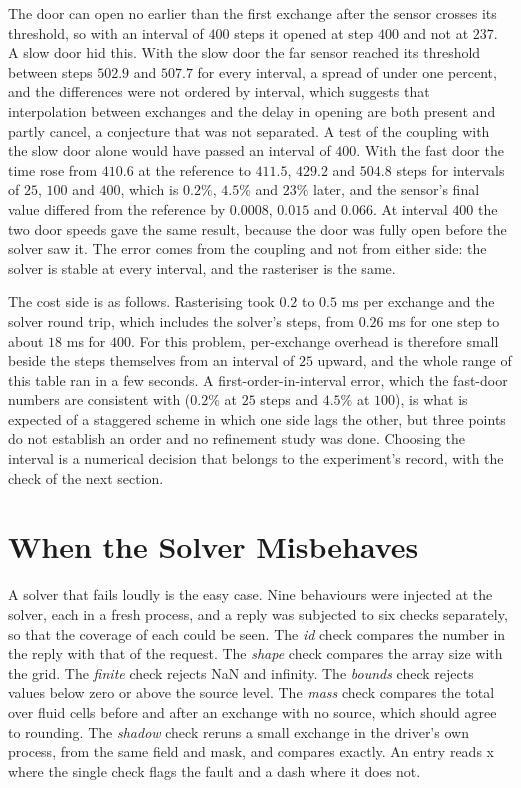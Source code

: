The door can open no earlier than the first exchange after the sensor crosses its threshold, so with an interval of $400$ steps it opened at step $400$ and not at $237$. A slow door hid this. With the slow door the far sensor reached its threshold between steps $502.9$ and $507.7$ for every interval, a spread of under one percent, and the differences were not ordered by interval, which suggests that interpolation between exchanges and the delay in opening are both present and partly cancel, a conjecture that was not separated. A test of the coupling with the slow door alone would have passed an interval of $400$. With the fast door the time rose from $410.6$ at the reference to $411.5$, $429.2$ and $504.8$ steps for intervals of $25$, $100$ and $400$, which is $0.2\%$, $4.5\%$ and $23\%$ later, and the sensor's final value differed from the reference by $0.0008$, $0.015$ and $0.066$. At interval $400$ the two door speeds gave the same result, because the door was fully open before the solver saw it. The error comes from the coupling and not from either side: the solver is stable at every interval, and the rasteriser is the same.

The cost side is as follows. Rasterising took $0.2$ to $0.5$ ms per exchange and the solver round trip, which includes the solver's steps, from $0.26$ ms for one step to about $18$ ms for $400$. For this problem, per-exchange overhead is therefore small beside the steps themselves from an interval of $25$ upward, and the whole range of this table ran in a few seconds. A first-order-in-interval error, which the fast-door numbers are consistent with ($0.2\%$ at $25$ steps and $4.5\%$ at $100$), is what is expected of a staggered scheme in which one side lags the other, but three points do not establish an order and no refinement study was done. Choosing the interval is a numerical decision that belongs to the experiment's record, with the check of the next section.

\section{When the Solver Misbehaves}

A solver that fails loudly is the easy case. Nine behaviours were injected at the solver, each in a fresh process, and a reply was subjected to six checks separately, so that the coverage of each could be seen. The \emph{id} check compares the number in the reply with that of the request. The \emph{shape} check compares the array size with the grid. The \emph{finite} check rejects NaN and infinity. The \emph{bounds} check rejects values below zero or above the source level. The \emph{mass} check compares the total over fluid cells before and after an exchange with no source, which should agree to rounding. The \emph{shadow} check reruns a small exchange in the driver's own process, from the same field and mask, and compares exactly. An entry reads x where the single check flags the fault and a dash where it does not.

